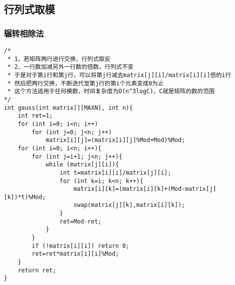 \subsection{行列式取模}

\subsubsection{辗转相除法}
\begin{verbatim}
/*
 * 1、若矩阵两行进行交换，行列式取反
 * 2、一行数加减另外一行数的倍数，行列式不变
 * 于是对于第i行和第j行，可以将第j行减去matrix[j][i]/matrix[i][i]倍的i行
 * 然后把两行交换，不断迭代至第j行的第i个元素变成0为止
 * 这个方法适用于任何模数，时间复杂度为O(n^3logC)，C就是矩阵的数的范围
*/
int gauss(int matrix[][MAXN], int n){
    int ret=1;
    for (int i=0; i<n; i++)
        for (int j=0; j<n; j++)
            matrix[i][j]=(matrix[i][j]%Mod+Mod)%Mod;
    for (int i=0; i<n; i++){
        for (int j=i+1; j<n; j++){
            while (matrix[j][i]){
                int t=matrix[i][i]/matrix[j][i];
                for (int k=i; k<n; k++){
                    matrix[i][k]=(matrix[i][k]+(Mod-matrix[j][k])*t)%Mod;
                    swap(matrix[j][k],matrix[i][k]);
                }
                ret=Mod-ret;
            }
        }
        if (!matrix[i][i]) return 0;
        ret=ret*matrix[i][i]%Mod;
    }
    return ret;
}
\end{verbatim}

~\\
~\\
